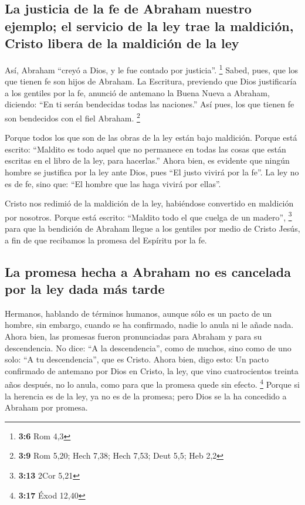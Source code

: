 \hypertarget{la-justicia-de-la-fe-de-abraham-nuestro-ejemplo-el-servicio-de-la-ley-trae-la-maldiciuxf3n-cristo-libera-de-la-maldiciuxf3n-de-la-ley}{%
\subsection{La justicia de la fe de Abraham nuestro ejemplo; el servicio
de la ley trae la maldición, Cristo libera de la maldición de la
ley}\label{la-justicia-de-la-fe-de-abraham-nuestro-ejemplo-el-servicio-de-la-ley-trae-la-maldiciuxf3n-cristo-libera-de-la-maldiciuxf3n-de-la-ley}}

 Así, Abraham ``creyó a Dios, y le fue contado por
justicia''. \footnote{\textbf{3:6} Rom 4,3}  Sabed, pues,
que los que tienen fe son hijos de Abraham.  La Escritura,
previendo que Dios justificaría a los gentiles por la fe, anunció de
antemano la Buena Nueva a Abraham, diciendo: ``En ti serán bendecidas
todas las naciones.''  Así pues, los que tienen fe son
bendecidos con el fiel Abraham. \footnote{\textbf{3:9} Rom 5,20; Hech
  7,38; Hech 7,53; Deut 5,5; Heb 2,2}

 Porque todos los que son de las obras de la ley están
bajo maldición. Porque está escrito: ``Maldito es todo aquel que no
permanece en todas las cosas que están escritas en el libro de la ley,
para hacerlas.''  Ahora bien, es evidente que ningún
hombre se justifica por la ley ante Dios, pues ``El justo vivirá por la
fe''.  La ley no es de fe, sino que: ``El hombre que las
haga vivirá por ellas''.

 Cristo nos redimió de la maldición de la ley, habiéndose
convertido en maldición por nosotros. Porque está escrito: ``Maldito
todo el que cuelga de un madero'', \footnote{\textbf{3:13} 2Cor 5,21}
 para que la bendición de Abraham llegue a los gentiles
por medio de Cristo Jesús, a fin de que recibamos la promesa del
Espíritu por la fe.

\hypertarget{la-promesa-hecha-a-abraham-no-es-cancelada-por-la-ley-dada-muxe1s-tarde}{%
\subsection{La promesa hecha a Abraham no es cancelada por la ley dada
más
tarde}\label{la-promesa-hecha-a-abraham-no-es-cancelada-por-la-ley-dada-muxe1s-tarde}}

 Hermanos, hablando de términos humanos, aunque sólo es
un pacto de un hombre, sin embargo, cuando se ha confirmado, nadie lo
anula ni le añade nada.  Ahora bien, las promesas fueron
pronunciadas para Abraham y para su descendencia. No dice: ``A la
descendencia'', como de muchos, sino como de uno solo: ``A tu
descendencia'', que es Cristo.  Ahora bien, digo esto: Un
pacto confirmado de antemano por Dios en Cristo, la ley, que vino
cuatrocientos treinta años después, no lo anula, como para que la
promesa quede sin efecto. \footnote{\textbf{3:17} Éxod 12,40}
 Porque si la herencia es de la ley, ya no es de la
promesa; pero Dios se la ha concedido a Abraham por promesa.

